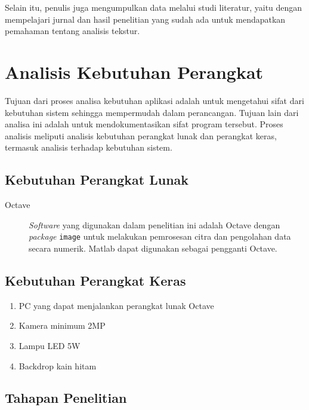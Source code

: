 \documentclass[laporan.tex]{subfiles}
\begin{document}
Selain itu, penulis juga mengumpulkan data melalui studi literatur, yaitu dengan mempelajari jurnal dan hasil penelitian yang sudah ada untuk mendapatkan pemahaman tentang analisis tekstur.

\section{Analisis Kebutuhan Perangkat}

Tujuan  dari  proses analisa kebutuhan aplikasi adalah untuk mengetahui sifat dari  kebutuhan  sistem  sehingga  mempermudah  dalam perancangan. Tujuan lain dari analisa ini adalah untuk mendokumentasikan sifat  program  tersebut. Proses analisis meliputi analisis kebutuhan perangkat lunak dan perangkat keras, termasuk analisis terhadap kebutuhan sistem.

\subsection{Kebutuhan Perangkat Lunak}

\begin{description}

\item [Octave] 
\emph{Software} yang digunakan dalam penelitian ini adalah Octave dengan \emph{package} \texttt{image} untuk melakukan pemrosesan citra dan pengolahan data secara numerik. Matlab dapat digunakan sebagai pengganti Octave.

\end{description}

\subsection{Kebutuhan Perangkat Keras}

\begin{enumerate}

\item PC yang dapat menjalankan perangkat lunak Octave
\item Kamera minimum 2MP
\item Lampu LED 5W
\item Backdrop kain hitam

\end{enumerate}

\subsection{Tahapan Penelitian}
\end{document}

